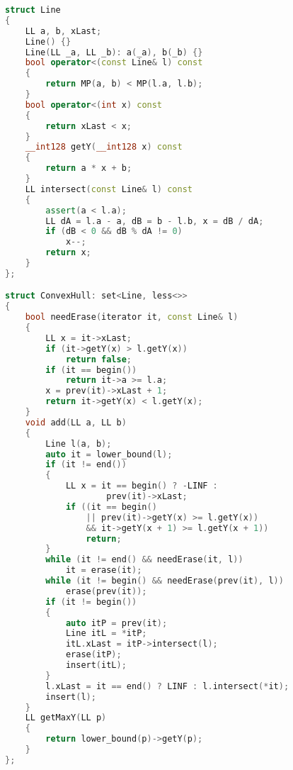 \begin{lstlisting}[caption={convex-hull-trick.hpp}, language=C++]
struct Line
{
	LL a, b, xLast;
	Line() {}
	Line(LL _a, LL _b): a(_a), b(_b) {}
	bool operator<(const Line& l) const
	{
		return MP(a, b) < MP(l.a, l.b);
	}
	bool operator<(int x) const
	{
		return xLast < x;
	}
	__int128 getY(__int128 x) const
	{
		return a * x + b;
	}
	LL intersect(const Line& l) const
	{
		assert(a < l.a);
		LL dA = l.a - a, dB = b - l.b, x = dB / dA;
		if (dB < 0 && dB % dA != 0)
			x--;
		return x;
	}
};

struct ConvexHull: set<Line, less<>>
{
	bool needErase(iterator it, const Line& l)
	{
		LL x = it->xLast;
		if (it->getY(x) > l.getY(x))
			return false;
		if (it == begin())
			return it->a >= l.a;
		x = prev(it)->xLast + 1;
		return it->getY(x) < l.getY(x);
	}
	void add(LL a, LL b)
	{
		Line l(a, b);
		auto it = lower_bound(l);
		if (it != end())
		{
			LL x = it == begin() ? -LINF :
					prev(it)->xLast;
			if ((it == begin()
				|| prev(it)->getY(x) >= l.getY(x))
				&& it->getY(x + 1) >= l.getY(x + 1))
				return;
		}
		while (it != end() && needErase(it, l))
			it = erase(it);
		while (it != begin() && needErase(prev(it), l))
			erase(prev(it));
		if (it != begin())
		{
			auto itP = prev(it);
			Line itL = *itP;
			itL.xLast = itP->intersect(l);
			erase(itP);
			insert(itL);
		}
		l.xLast = it == end() ? LINF : l.intersect(*it);
		insert(l);
 	}
	LL getMaxY(LL p)
	{
		return lower_bound(p)->getY(p);
	}
};
\end{lstlisting}
